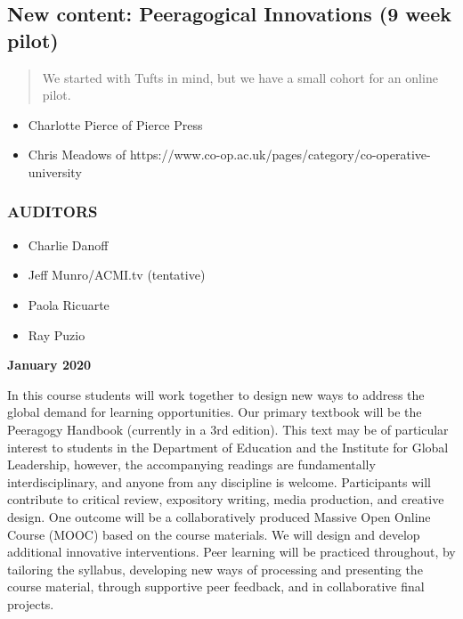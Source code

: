 \hypertarget{new-content-peeragogical-innovations-9-week-pilot}{%
\subsection{New content: Peeragogical Innovations (9 week
pilot)}\label{new-content-peeragogical-innovations-9-week-pilot}}

\begin{quote}
We started with Tufts in mind, but we have a small cohort for an online
pilot.
\end{quote}

\begin{itemize}
\tightlist
\item
  Charlotte Pierce of Pierce Press
\item
  Chris Meadows of
  https://www.co-op.ac.uk/pages/category/co-operative-university
\end{itemize}

\hypertarget{auditors}{%
\subsubsection{AUDITORS}\label{auditors}}

\begin{itemize}
\tightlist
\item
  Charlie Danoff
\item
  Jeff Munro/ACMI.tv (tentative)
\item
  Paola Ricuarte
\item
  Ray Puzio
\end{itemize}

\textbf{January 2020}

In this course students will work together to design new ways to address
the global demand for learning opportunities. Our primary textbook will
be the Peeragogy Handbook (currently in a 3rd edition). This text may be
of particular interest to students in the Department of Education and
the Institute for Global Leadership, however, the accompanying readings
are fundamentally interdisciplinary, and anyone from any discipline is
welcome. Participants will contribute to critical review, expository
writing, media production, and creative design. One outcome will be a
collaboratively produced Massive Open Online Course (MOOC) based on the
course materials. We will design and develop additional innovative
interventions. Peer learning will be practiced throughout, by tailoring
the syllabus, developing new ways of processing and presenting the
course material, through supportive peer feedback, and in collaborative
final projects.

